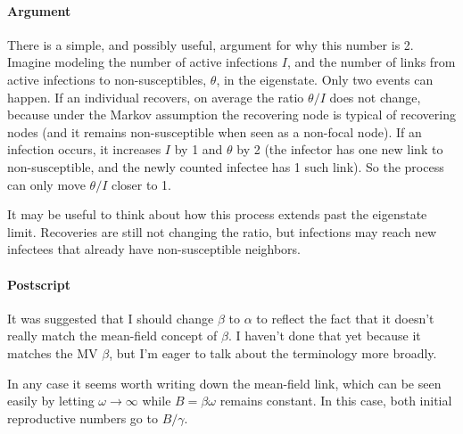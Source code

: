 \documentclass[12pt]{article}
\begin{document}
\paragraph{Argument} There is a simple, and possibly useful, argument for why this number is 2. Imagine modeling the number of active infections $I$, and the number of links from active infections to non-susceptibles, $\theta$, in the eigenstate. Only two events can happen. If an individual recovers, on average the ratio $\theta/I$ does not change, because under the Markov assumption the recovering node is typical of recovering nodes (and it remains non-susceptible when seen as a non-focal node). If an infection occurs, it increases $I$ by 1 and $\theta$ by 2 (the infector has one new link to non-susceptible, and the newly counted infectee has 1 such link). So the process can only move $\theta/I$ closer to 1.

It may be useful to think about how this process extends past the eigenstate limit. Recoveries are still not changing the ratio, but infections may reach new infectees that already have non-susceptible neighbors.

\paragraph*{Postscript} It was suggested that I should change $\beta$ to $\alpha$ to reflect the fact that it doesn't really match the mean-field concept of $\beta$. I haven't done that yet because it matches the MV $\beta$, but I'm eager to talk about the terminology more broadly.

In any case it seems worth writing down the mean-field link, which can be seen easily by letting $\omega\to\infty$ while $B=\beta\omega$ remains constant. In this case, both initial reproductive numbers go to $B/\gamma$.
\end{document}
